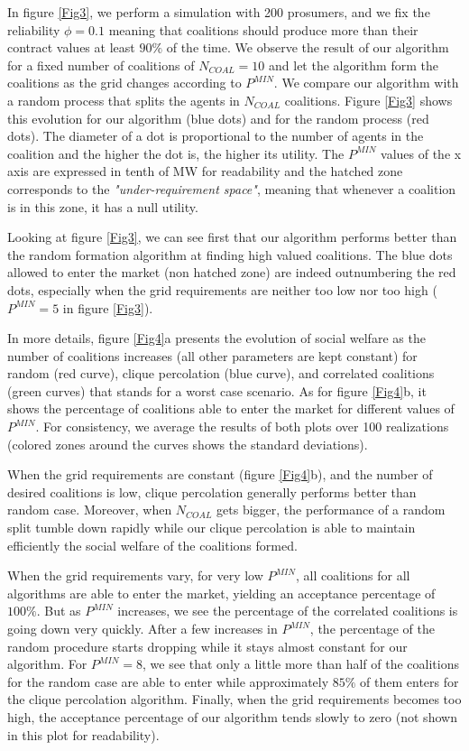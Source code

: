 \documentclass[conference]{IEEEtran}
\begin{document}
In figure \ref{Fig3}, we perform a simulation with 200 prosumers, and we fix the reliability $ \phi = 0.1 $ meaning that coalitions should produce more than their contract values at least $ 90 \% $ of the time. We observe the result of our algorithm for a fixed number of coalitions of $N_{COAL} = 10$ and let the algorithm form the coalitions as the grid changes according to $ P^{MIN} $. We compare our algorithm with a random process that splits the agents in $ N_{COAL} $ coalitions. Figure \ref{Fig3} shows this evolution for our algorithm (blue dots) and for the random process (red dots). The diameter of a dot is proportional to the number of agents in the coalition and the higher the dot is, the higher its utility. The $ P^{MIN} $ values of the x axis are expressed in tenth of MW for readability and the hatched zone corresponds to the \textit{"under-requirement space"}, meaning that whenever a coalition is in this zone, it has a null utility. 

Looking at figure \ref{Fig3}, we can see first that our algorithm performs better than the random formation algorithm at finding high valued coalitions. The blue dots allowed to enter the market (non hatched zone) are indeed outnumbering the red dots, especially when the grid requirements are neither too low nor too high ($ P^{MIN} = 5 $ in figure \ref{Fig3}).

In more details, figure \ref{Fig4}a presents the evolution of social welfare as the number of coalitions increases (all other parameters are kept constant) for random (red curve), clique percolation (blue curve), and correlated coalitions (green curves) that stands for a worst case scenario. As for figure \ref{Fig4}b, it shows the percentage of coalitions able to enter the market for different values of $ P^{MIN} $. For consistency, we average the results of both plots over 100 realizations (colored zones around the curves shows the standard deviations).

When the grid requirements are constant (figure \ref{Fig4}b), and the number of desired coalitions is low, clique percolation generally performs better than random case. Moreover, when $ N_{COAL} $ gets bigger, the performance of a random split tumble down rapidly while our clique percolation is able to maintain efficiently the social welfare of the coalitions formed.

When the grid requirements vary, for very low $ P^{MIN} $, all coalitions for all algorithms are able to enter the market, yielding an acceptance percentage of $ 100 \% $. But as $ P^{MIN} $ increases, we see the percentage of the correlated coalitions is going down very quickly. After a few increases in $ P^{MIN} $, the percentage of the random procedure starts dropping while it stays almost constant for our algorithm. For $ P^{MIN} = 8 $, we see that only a little more than half of the coalitions for the random case are able to enter while approximately $ 85 \%$ of them enters for the clique percolation algorithm. Finally, when the grid requirements becomes too high, the acceptance percentage of our algorithm tends slowly to zero (not shown in this plot for readability).
\end{document}
